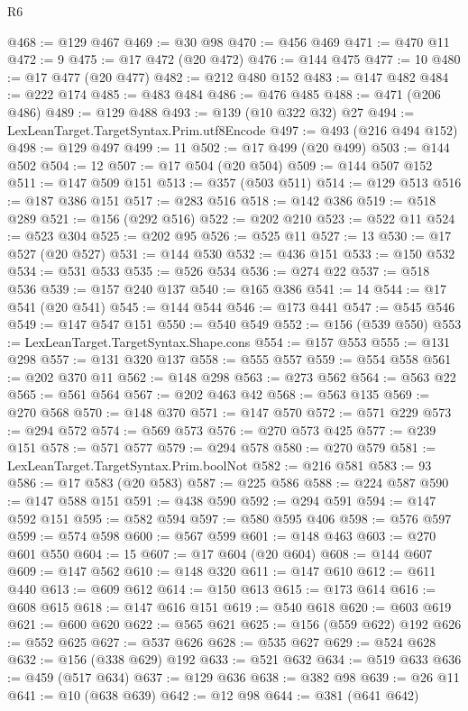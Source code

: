 \begin{lexlean}{R6}
\begin{coremodule}
@468 := @129 @467
@469 := @30 @98
@470 := @456 @469
@471 := @470 @11
@472 := 9
@475 := @17 @472 (@20 @472)
@476 := @144 @475
@477 := 10
@480 := @17 @477 (@20 @477)
@482 := @212 @480 @152
@483 := @147 @482
@484 := @222 @174
@485 := @483 @484
@486 := @476 @485
@488 := @471 (@206 @486)
@489 := @129 @488
@493 := @139 (@10 @322 @32) @27
@494 := LexLeanTarget.TargetSyntax.Prim.utf8Encode
@497 := @493 (@216 @494 @152)
@498 := @129 @497
@499 := 11
@502 := @17 @499 (@20 @499)
@503 := @144 @502
@504 := 12
@507 := @17 @504 (@20 @504)
@509 := @144 @507 @152
@511 := @147 @509 @151
@513 := @357 (@503 @511)
@514 := @129 @513
@516 := @187 @386 @151
@517 := @283 @516
@518 := @142 @386
@519 := @518 @289
@521 := @156 (@292 @516)
@522 := @202 @210
@523 := @522 @11
@524 := @523 @304
@525 := @202 @95
@526 := @525 @11
@527 := 13
@530 := @17 @527 (@20 @527)
@531 := @144 @530
@532 := @436 @151
@533 := @150 @532
@534 := @531 @533
@535 := @526 @534
@536 := @274 @22
@537 := @518 @536
@539 := @157 @240 @137
@540 := @165 @386
@541 := 14
@544 := @17 @541 (@20 @541)
@545 := @144 @544
@546 := @173 @441
@547 := @545 @546
@549 := @147 @547 @151
@550 := @540 @549
@552 := @156 (@539 @550)
@553 := LexLeanTarget.TargetSyntax.Shape.cons
@554 := @157 @553
@555 := @131 @298
@557 := @131 @320 @137
@558 := @555 @557
@559 := @554 @558
@561 := @202 @370 @11
@562 := @148 @298
@563 := @273 @562
@564 := @563 @22
@565 := @561 @564
@567 := @202 @463 @42
@568 := @563 @135
@569 := @270 @568
@570 := @148 @370
@571 := @147 @570
@572 := @571 @229
@573 := @294 @572
@574 := @569 @573
@576 := @270 @573 @425
@577 := @239 @151
@578 := @571 @577
@579 := @294 @578
@580 := @270 @579
@581 := LexLeanTarget.TargetSyntax.Prim.boolNot
@582 := @216 @581
@583 := 93
@586 := @17 @583 (@20 @583)
@587 := @225 @586
@588 := @224 @587
@590 := @147 @588 @151
@591 := @438 @590
@592 := @294 @591
@594 := @147 @592 @151
@595 := @582 @594
@597 := @580 @595 @406
@598 := @576 @597
@599 := @574 @598
@600 := @567 @599
@601 := @148 @463
@603 := @270 @601 @550
@604 := 15
@607 := @17 @604 (@20 @604)
@608 := @144 @607
@609 := @147 @562
@610 := @148 @320
@611 := @147 @610
@612 := @611 @440
@613 := @609 @612
@614 := @150 @613
@615 := @173 @614
@616 := @608 @615
@618 := @147 @616 @151
@619 := @540 @618
@620 := @603 @619
@621 := @600 @620
@622 := @565 @621
@625 := @156 (@559 @622) @192
@626 := @552 @625
@627 := @537 @626
@628 := @535 @627
@629 := @524 @628
@632 := @156 (@338 @629) @192
@633 := @521 @632
@634 := @519 @633
@636 := @459 (@517 @634)
@637 := @129 @636
@638 := @382 @98
@639 := @26 @11
@641 := @10 (@638 @639)
@642 := @12 @98
@644 := @381 (@641 @642)

\end{coremodule}
\end{lexlean}
